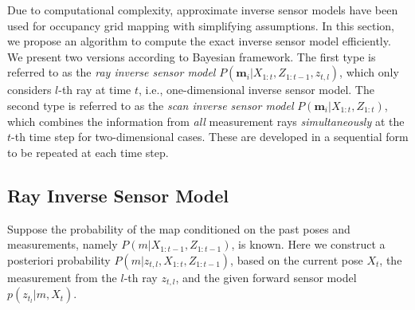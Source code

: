 \documentclass[letterpaper, 10pt, conference]{ieeeconf}
\begin{document}
Due to computational complexity, approximate inverse sensor models have been used for occupancy grid mapping with simplifying assumptions. In this section, we propose an algorithm to compute the exact inverse sensor model efficiently. 
We present two versions according to Bayesian framework. The first type is referred to as the \emph{ray inverse sensor model} $P(\mathbf{m}_i|X_{1:t},Z_{1:t-1},z_{t,l})$, which only considers $l$-th ray at time $t$, i.e., one-dimensional inverse sensor model. The second type is referred to as the \emph{scan inverse sensor model} $P(\mathbf{m}_i|X_{1:t},Z_{1:t})$, which combines the information from \emph{all} measurement rays \emph{simultaneously} at the $t$-th time step for two-dimensional cases. These are developed in a sequential form to be repeated at each time step.



\subsection{Ray Inverse Sensor Model}

Suppose the probability of the map conditioned on the past poses and measurements, namely $P(m|X_{1:t-1},Z_{1:t-1})$, is known. Here we construct a posteriori probability $P(m|z_{t,l},X_{1:t},Z_{1:t-1})$, based on the current pose $X_t$, the measurement from the $l$-th ray $z_{t,l}$, and the given forward sensor model $p(z_{t_l}|m,X_t)$.
\end{document}
